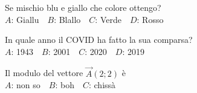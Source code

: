 \mcquestionfooter



\def\mcquestionnumber{10}


\mcquestionheader Se mischio blu e giallo che colore ottengo?\\
{$A$}: Giallu\ \ {$B$}: Blallo\ \ {$C$}: Verde\ \ {$D$}: Rosso\ \ 

\mcquestionfooter



\def\mcquestionnumber{11}


\mcquestionheader In quale anno il COVID ha fatto la sua comparsa?\\
{$A$}: 1943\ \ {$B$}: 2001\ \ {$C$}: 2020\ \ {$D$}: 2019\ \ 

\mcquestionfooter



\def\mcquestionnumber{12}


\mcquestionheader Il modulo del vettore $\vec{A}(2;2)$ è\\
{$A$}: non so\ \ {$B$}: boh\ \ {$C$}: chissà\ \ 

\mcquestionfooter



\mcpaperfooter

